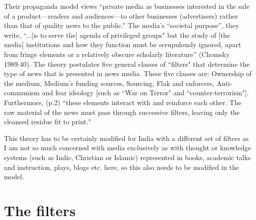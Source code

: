 Their propaganda model views “private media as businesses interested in the sale of a product—readers and audiences—to other businesses (advertisers) rather than that of quality news to the public.” The media's “societal purpose”, they write, “...[is to serve the] agenda of privileged groups" but the study of [the media] institutions and how they function must be scrupulously ignored, apart from fringe elements or a relatively obscure scholarly literature” (Chomsky 1989:40). The theory postulates five general classes of ``filters" that determine the type of news that is presented in news media. These five classes are: Ownership of the medium, Medium’s funding sources, Sourcing, Flak and enforcers, Anti-communism and fear ideology [such as ``War on Terror" and ``counter-terrorism"]. Furthermore, (p.2) ``these elements interact with and reinforce each other. The raw material of the news must pass through successive filters, leaving only the cleansed residue fit to print."
\vskip 2pt

This theory has to be certainly modified for India with a different set of filters as I am not so much concerned with media exclusively as with thought or knowledge systems (such as Indic, Christian or Islamic) represented in books, academic talks and instruction, plays, blogs etc. here, so this also needs to be modified in the model.

\section*{The filters}

